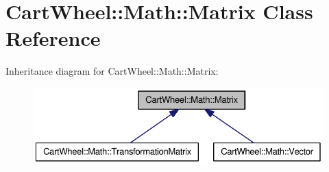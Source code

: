 \hypertarget{classCartWheel_1_1Math_1_1Matrix}{
\section{CartWheel::Math::Matrix Class Reference}
\label{classCartWheel_1_1Math_1_1Matrix}
}


Inheritance diagram for CartWheel::Math::Matrix:\nopagebreak
\begin{figure}[H]
\begin{center}
\leavevmode
\includegraphics[width=360pt]{classCartWheel_1_1Math_1_1Matrix__inherit__graph}
\end{center}
\end{figure}
